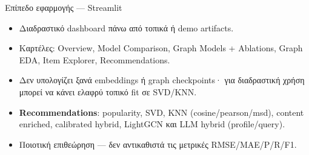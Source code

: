 \documentclass[11pt,aspectratio=169]{beamer}
\begin{document}
\begin{frame}{Επίπεδο εφαρμογής — Streamlit}
  \begin{itemize}
    \item Διαδραστικό dashboard πάνω από τοπικά ή demo artifacts.
    \item Καρτέλες: Overview, Model Comparison, Graph Models + Ablations, Graph EDA, Item Explorer, Recommendations.
    \item Δεν υπολογίζει ξανά embeddings ή graph checkpoints· για διαδραστική χρήση μπορεί να κάνει ελαφρύ τοπικό fit σε SVD/KNN.
    \item \textbf{Recommendations}: popularity, SVD, KNN (cosine/pearson/msd), content enriched, calibrated hybrid, LightGCN και LLM hybrid (profile/query).
    \item \alert{Ποιοτική επιθεώρηση} — δεν αντικαθιστά τις μετρικές RMSE/MAE/P/R/F1.
  \end{itemize}
\end{frame}

\end{document}

